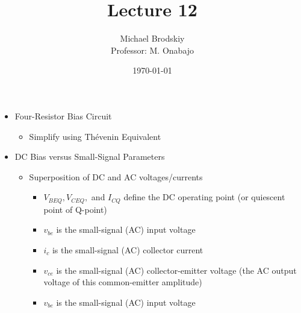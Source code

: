 


\title{Lecture 12}
\date{\today}
\author{Michael Brodskiy\\ \small Professor: M. Onabajo}



\maketitle

\begin{itemize}

  \item Four-Resistor Bias Circuit

    \begin{itemize}

      \item Simplify using Th\'evenin Equivalent

    \end{itemize}

  \item DC Bias versus Small-Signal Parameters

    \begin{itemize}

      \item Superposition of DC and AC voltages/currents

        \begin{itemize}

          \item $V_{BEQ}, V_{CEQ},$ and $I_{CQ}$ define the DC operating point (or quiescent point of Q-point)

          \item $v_{be}$ is the small-signal (AC) input voltage

          \item $i_{c}$ is the small-signal (AC) collector current

          \item $v_{ce}$ is the small-signal (AC) collector-emitter voltage (the AC output voltage of this common-emitter amplitude)

          \item $v_{be}$ is the small-signal (AC) input voltage

        \end{itemize}

    \end{itemize}

\end{itemize}



